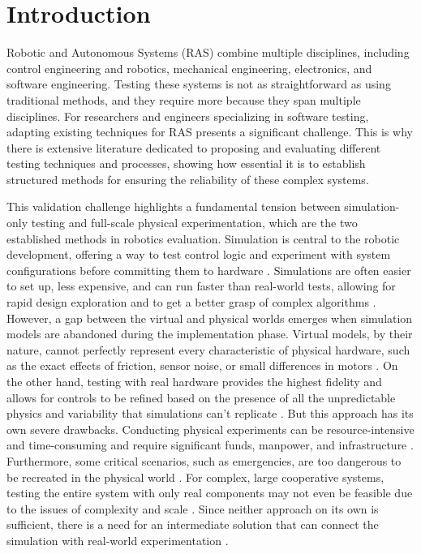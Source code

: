 \chapter{Introduction} \label{chap:introduction}

Robotic and Autonomous Systems (RAS) combine multiple disciplines, including control engineering and robotics, mechanical engineering, electronics, and software engineering. Testing these systems is not as straightforward as using traditional methods, and they require more because they span multiple disciplines. For researchers and engineers specializing in software testing, adapting existing techniques for RAS presents a significant challenge. This is why there is extensive literature dedicated to proposing and evaluating different testing techniques and processes, showing how essential it is to establish structured methods for ensuring the reliability of these complex systems. \cite{AMV23}

This validation challenge highlights a fundamental tension between simulation-only testing and full-scale physical experimentation, which are the two established methods in robotics evaluation. Simulation is central to the robotic development, offering a way to test control logic and experiment with system configurations before committing them to hardware \cite{Hu05, Mic04}. Simulations are often easier to set up, less expensive, and can run faster than real-world tests, allowing for rapid design exploration and to get a better grasp of complex algorithms \cite{Mic04, Dos17, BM18}. However, a gap between the virtual and physical worlds emerges when simulation models are abandoned during the implementation phase. Virtual models, by their nature, cannot perfectly represent every characteristic of physical hardware, such as the exact effects of friction, sensor noise, or small differences in motors \cite{Hu05, BM18}. On the other hand, testing with real hardware provides the highest fidelity and allows for controls to be refined based on the presence of all the unpredictable physics and variability that simulations can’t replicate \cite{Hu05, Cas21}. But this approach has its own severe drawbacks. Conducting physical experiments can be resource-intensive and time-consuming and require significant funds, manpower, and infrastructure \cite{Hu05, Dos17, Mic04}. Furthermore, some critical scenarios, such as emergencies, are too dangerous to be recreated in the physical world \cite{Hu05}. For complex, large cooperative systems, testing the entire system with only real components may not even be feasible due to the issues of complexity and scale \cite{Hu05}. Since neither approach on its own is sufficient, there is a need for an intermediate solution that can connect the simulation with real-world experimentation \cite{Hu05}.


